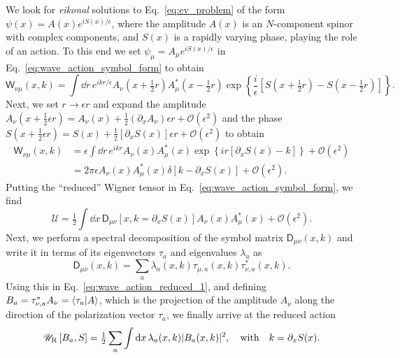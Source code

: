 We look for \emph{eikonal} solutions to Eq.~\eqref{eq:ev_problem} of the form $\psi(x) = A(x)e^{iS(x)/\epsilon}$, where the amplitude $A(x)$ is an $N$-component spinor with complex components, and $S(x)$ is a rapidly varying phase, playing the role of an action.
To this end we set $\psi_{\mu} = A_{\mu}e^{iS(x)/\epsilon}$ in Eq.~\eqref{eq:wave_action_symbol_form} to obtain%
%
\begin{equation}
    \mathsf{W}_{\nu\mu}(x, k) = \int \dd{r}\,e^{ikr/\epsilon} A_{\nu}\left(x + \tfrac{1}{2} r\right)A_{\mu}^{*}\left(x - \tfrac{1}{2} r\right)\exp\left\{\frac{i}{\epsilon}\left[S\left(x + \tfrac{1}{2} r\right) - S\left(x - \tfrac{1}{2} r\right)\right]\right\}.
\end{equation}
%
Next, we set $r \to \epsilon r$ and expand the amplitude $A_{\nu}(x + \frac{1}{2}\epsilon r) = A_{\nu}(x) + \frac{1}{2}(\partial_{x}A_{\nu})\epsilon r + \mathcal{O}(\epsilon^{2})$ and the phase $S(x + \frac{1}{2}\epsilon r) = S(x) + \frac{1}{2}[\partial_{x}S(x)]\epsilon r + \mathcal{O}(\epsilon^{2})$ to obtain
%
\begin{equation}
  \begin{aligned}
    \mathsf{W}_{\nu\mu}(x, k) &= \epsilon\int \dd{r}\,e^{ikr} A_{\nu}(x)A_{\mu}^{*}(x)\exp\left\{ir\left[\partial_{x}S(x) - k\right]\right\} + \mathcal{O}(\epsilon^{2}) \\
                        &= 2\pi\epsilon A_{\nu}(x)A^{*}_{\mu}(x)\delta\left[k - \partial_{x}S(x)\right] + \mathcal{O}(\epsilon^{2}).
  \end{aligned}
\end{equation}
%
Putting the ``reduced'' Wigner tensor in Eq.~\eqref{eq:wave_action_symbol_form}, we find
%
\begin{equation}
  \mathscr{U} = \tfrac{1}{2}\int \dd{x}\, \mathsf{D}_{\mu\nu}\left[x, k=\partial_{x}S(x)\right]A_{\nu}(x)A^{*}_{\mu}(x) + \mathcal{O}(\epsilon^{2}).
  \label{eq:wave_action_reduced_1}
\end{equation}
%
Next, we perform a spectral decomposition of the symbol matrix $\mathsf{D}_{\mu\nu}(x, k)$ and write it in terms of its eigenvectors $\tau_{a}$ and eigenvalues $\lambda_{a}$ as
%
\begin{equation}
  \mathsf{D}_{\mu\nu}(x, k) = \sum_{a} \lambda_{a}(x, k) \tau_{\mu, a}(x, k) \tau_{\nu, a}^{*}(x, k).
\end{equation}
%
Using this in Eq.~\eqref{eq:wave_action_reduced_1}, and defining $B_{a} = \tau_{\nu, a}^{*}A_{\nu} = \mathinner{\langle{\tau_{a}|A}\rangle}$, which is the projection of the amplitude $A_{\nu}$ along the direction of the polarization vector $\tau_{a}$, we finally arrive at the reduced action
%
\begin{equation}
  \mathscr{U}_{\text{R}}\left[B_{a}, S\right] = \tfrac{1}{2} \sum_{a} \int \mathrm{d}{x}\, \lambda_{a}(x,k) \lvert B_{a}(x, k)\rvert^{2},
  \quad\text{with}\quad
  k = \partial_{x}S(x).
\end{equation}
%


